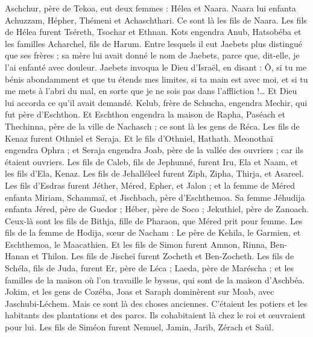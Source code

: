 \begin{multicols}{2}
Aschchur, père de Tekoa, eut deux femmes : Hélea et Naara.
Naara lui enfanta Achuzzam, Hépher, Thémeni et Achaschthari. Ce sont là les fils de Naara.
Les fils de Hélea furent Tséreth, Tsochar et Ethnan.
Kots engendra Anub, Hatsobéba et les familles Acharchel, fils de Harum.
Entre lesquels il eut Jaebets plus distingué que ses frères ; sa mère lui avait donné le nom de Jaebets, parce que, dit-elle, je l'ai enfanté avec douleur.
Jaebets invoqua le Dieu d'Israël, en disant : Ô, si tu me bénis abondamment et que tu étends mes limites, si ta main est avec moi, et si tu me mets à l'abri du mal, en sorte que je ne sois pas dans l'affliction !… Et Dieu lui accorda ce qu'il avait demandé.
Kelub, frère de Schucha, engendra Mechir, qui fut père d'Eschthon.
Et Eschthon engendra la maison de Rapha, Paséach et Thechinna, père de la ville de Nachasch ; ce sont là les gens de Réca.
Les fils de Kenaz furent Othniel et Seraja. Et le fils d'Othniel, Hathath.
Meonothaï engendra Ophra ; et Seraja engendra Joab, père de la vallée des ouvriers ; car ils étaient ouvriers.
Les fils de Caleb, fils de Jephunné, furent Iru, Ela et Naam, et les fils d'Ela, Kenaz.
Les fils de Jehalléleel furent Ziph, Zipha, Thirja, et Asareel.
Les fils d'Esdras furent Jéther, Méred, Epher, et Jalon ; et la femme de Méred enfanta Miriam, Schammaï, et Jischbach, père d'Eschthemoa.
Sa femme Jéhudija enfanta Jéred, père de Guedor ; Héber, père de Soco ; Jekuthiel, père de Zanoach. Ceux-là sont les fils de Bithja, fille de Pharaon, que Méred prit pour femme.
Les fils de la femme de Hodija, sœur de Nacham : Le père de Kehila, le Garmien, et Eschthemoa, le Maacathien.
Et les fils de Simon furent Amnon, Rinna, Ben-Hanan et Thilon. Les fils de Jischeï furent Zocheth et Ben-Zocheth.
Les fils de Schéla, fils de Juda, furent Er, père de Léca ; Laeda, père de Maréscha ; et les familles de la maison où l'on travaille le byssus, qui sont de la maison d'Aschbéa.
Jokim, et les gens de Cozéba, Joas et Saraph dominèrent sur Moab, avec Jaschubi-Léchem. Mais ce sont là des choses anciennes.
C'étaient les potiers et les habitants des plantations et des parcs. Ils cohabitaient là chez le roi et œuvraient pour lui.
Les fils de Siméon furent Nemuel, Jamin, Jarib, Zérach et Saül.

\end{multicols}
